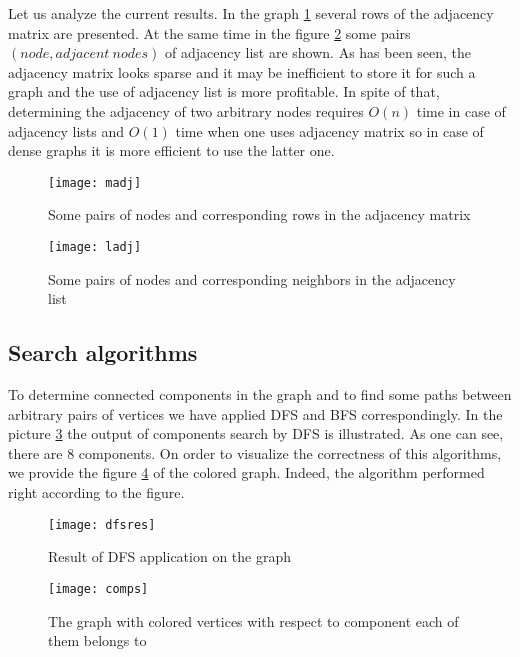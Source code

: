 \documentclass[12pt, bachelor, substylefile = algo_title.rtx]{disser}
\theoremstyle{definition}
\begin{document}
Let us analyze the current results. In the graph \ref{fig: 2} several rows of the adjacency matrix are presented. At the same time in the figure \ref{fig: 3} some pairs $(node, adjacent\ nodes)$ of adjacency list are shown. As has been seen, the adjacency matrix looks sparse and it may be inefficient to store it for such a graph and the use of adjacency list is more profitable. In spite of that, determining the adjacency of two arbitrary nodes requires $O(n)$ time in case of adjacency lists and $O(1)$ time when one uses adjacency matrix so in case of dense graphs it is more efficient to use the latter one.
\begin{figure}[!h]
\begin{center}
\texttt{[image: madj]}
\caption{Some pairs of nodes and corresponding rows in the adjacency matrix}
\label{fig: 2}
\end{center}
\end{figure}

\begin{figure}[!h]
\begin{center}
\texttt{[image: ladj]}
\caption{Some pairs of nodes and corresponding neighbors in the adjacency list}
\label{fig: 3}
\end{center}
\end{figure}

\subsection{Search algorithms}
To determine connected components in the graph and to find some paths between arbitrary pairs of vertices we have applied DFS and BFS correspondingly. In the picture \ref{fig: 4} the output of components search by DFS is illustrated. As one can see, there are $8$ components. On order to visualize the correctness of this algorithms, we provide the figure \ref{fig: 5} of the colored graph. Indeed, the algorithm performed right according to the figure.

\begin{figure}[!h]
\begin{center}
\texttt{[image: dfsres]}
\caption{Result of DFS application on the graph}
\label{fig: 4}
\end{center}
\end{figure}

\begin{figure}[!h]
\begin{center}
\texttt{[image: comps]}
\caption{The graph with colored vertices with respect to component each of them belongs to}
\label{fig: 5}
\end{center}
\end{figure}
\end{document}
